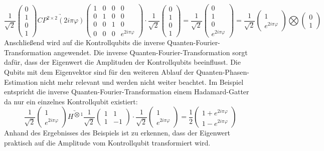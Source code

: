 \[
  \frac{1}{\sqrt{2}}
  \begin{pmatrix}
   0 \\
   1 \\
   0 \\
   1
  \end{pmatrix}
  \underrightarrow{CP^{2\times 2}(2 i \pi \varphi)}
  \begin{pmatrix}
    1 & 0 & 0 & 0\\
    0 & 1 & 0 & 0\\
    0 & 0 & 1 & 0\\
    0 & 0 & 0 & e^{2 i \pi \varphi}
  \end{pmatrix}
  \cdot
  \frac{1}{\sqrt{2}}
  \begin{pmatrix}
   0 \\
   1 \\
   0 \\
   1
  \end{pmatrix}
  =
  \frac{1}{\sqrt{2}}
  \begin{pmatrix}
    0 \\
    1 \\
    0 \\
    e^{2 i \pi \varphi}
  \end{pmatrix}
  =
  \frac{1}{\sqrt{2}}
  \begin{pmatrix}
    1 \\
    e^{2 i \pi \varphi}
   \end{pmatrix}
   \bigotimes
   \begin{pmatrix}
    0 \\
    1 
   \end{pmatrix}
  \]
Anschließend wird auf die Kontrollqubits die inverse Quanten-Fourier-Transformation angewendet.
Die inverse Quanten-Fourier-Transformation sorgt dafür, 
dass der Eigenwert die Amplituden der Kontrollqubits beeinflusst.
Die Qubits mit dem Eigenvektor sind für den weiteren Ablauf der Quanten-Phasen-Estimation nicht mehr relevant 
und werden nicht weiter beachtet.
Im Beispiel entspricht die inverse Quanten-Fourier-Transformation einem Hadamard-Gatter da nur ein einzelnes Kontrollqubit existiert:
\[
\frac{1}{\sqrt{2}}
\begin{pmatrix}
  1 \\
  e^{2 i \pi \varphi}
 \end{pmatrix}
 \underrightarrow{H^{\bigotimes 1}}
 \frac{1}{\sqrt{2}}
 \begin{pmatrix}
  1 & 1\\
  1 & -1
 \end{pmatrix}
 \cdot
 \frac{1}{\sqrt{2}}
\begin{pmatrix}
  1 \\
  e^{2 i \pi \varphi}
 \end{pmatrix}
 =
 \frac{1}{2}
 \begin{pmatrix}
  1 + e^{2 i \pi \varphi}\\
  1 - e^{2 i \pi \varphi}
 \end{pmatrix}
\]
Anhand des Ergebnisses des Beispiels ist zu erkennen, dass der Eigenwert praktisch auf die Amplitude vom Kontrollqubit transformiert wird.

